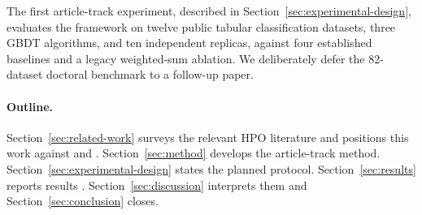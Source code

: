 The first article-track experiment, described in
Section~\ref{sec:experimental-design}, evaluates the framework on
twelve public tabular classification datasets, three GBDT algorithms,
and ten independent replicas, against four established baselines and a
legacy weighted-sum ablation. We deliberately defer the
82-dataset doctoral benchmark to a follow-up paper.

\paragraph{Outline.} Section~\ref{sec:related-work} surveys the
relevant HPO literature and positions this work against
\citet{pereira2025eaai} and \citet{ribeiro2026dissertation}.
Section~\ref{sec:method} develops the article-track method.
Section~\ref{sec:experimental-design} states the planned protocol.
Section~\ref{sec:results} reports results
.
Section~\ref{sec:discussion} interprets them and
Section~\ref{sec:conclusion} closes.
